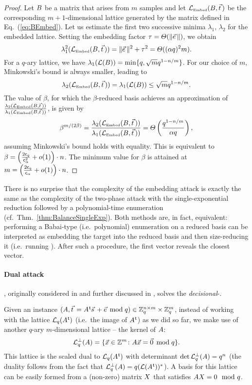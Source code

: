 \begin{proof}
	Let $B$ be a matrix that arises from $m$ \LWE samples and let $\LEmb(B, \tvec)$ be the corresponding $m+1$-dimensional lattice generated by the matrix defined in Eq.~(\ref{eq:BEmbed}). Let us estimate the first two successive minima $\lambda_1$, $\lambda_2$ for the embedded lattice. Setting the embedding factor $\tau = \TLandau(\| \evec \|)$, we obtain
	\[
		\lambda_1^2(\LEmb(\BMat, \tvec)) = \| \evec \|^2 + \tau^2 = \TLandau((\alpha q)^2 m).
	\]
	For a $q$-ary \LWE lattice, we have $\lambda_1(\mathcal{L}(B)) =\min \{ q, \sqrt{m} q^{1 - n/m} \}$. For our choice of $m$, Minkowski's bound is always smaller, leading to
	\[
		\lambda_2(\LEmb(\BMat, \tvec)) = \lambda_1(\Lat(\BMat)) \leq \sqrt{m} q^{1 - n/m}.
	\] 
	The value of $\beta$, for which the $\beta$-reduced basis achieves an approximation of $\frac{\lambda_2(\LEmb(\BMat, \tvec))} { \lambda_1(\LEmb(\BMat, \tvec))}$, is given by
	\[
		\beta^{m / (2 \beta)} = \frac{\lambda_2(\LEmb(\BMat, \tvec))}{\lambda_1(\LEmb(\BMat, \tvec))} = \TLandau \left( \frac{q^{1-n/m}}{\alpha q} \right),
	\]
	assuming Minkowski's bound holds with equality. This is equivalent to $\beta = \left( \frac{2 \mathsf{c}_q}{\mathsf{c}_{\alpha}^2} + o(1) \right) \cdot n$. The minimum value for $\beta$ is attained at $m = \left( \frac{2 \mathsf{c}_q}{\mathsf{c}_{\alpha}} + o(1) \right) \cdot n$. 
\end{proof}

There is no surprise that the complexity of the embedding attack is exactly the same as the complexity of the two-phase \BDD attack with the single-exponential reduction followed by a polynomial-time enumeration (cf.\ Thm.~\ref{thm:BalanceSingleExp}). Both methods are, in fact, equivalent: performing a Babai-type (i.e.\ polynomial) enumeration on a reduced basis can be interpreted as embedding the target into the reduced basis and then size-reducing it (i.e.\ running \LLL). After such a procedure, the first vector reveals the closest vector.

\paragraph{Dual attack \hspace*{-8pt}}, originally considered in \cite{MicReg09} and further discussed in \cite{C:KirFou15}, solves the \emph{decisional}-\LWE. 

Given an \LWE instance $(\AMat, \tvec = \AMat\transpose \svec + \evec \bmod q) \in \Z_q^{n \times m} \times \Z_q^m$, instead of working with the lattice $\mathcal{L}_q(A\mkern0.7mu^{\mathsf{ t}})$ (i.e.\ the image of $A\mkern0.7mu^{\mathsf{ t}}$) as we did so far, we make use of another $q$-ary $m$-dimensional lattice -- the kernel of $A$:
\begin{align} \label{eq:DualLattice}
	\qLATTp (\AMat) = \{ \xvec \in \Z^m \colon \AMat \xvec = \zerovec \bmod q \}.
\end{align}
This lattice is the scaled dual to $\mathcal{L}_q(A\mkern0.7mu^{\mathsf{ t}})$ with determinant $\det \mathcal{L}_q^{\perp} (A) = q^n$ (the duality follows from the fact that $\mathcal{L}_q^{\perp} (A) = q (\mathcal{L}(A\mkern0.7mu^{\mathsf{ t}}))^*$). A basis for this lattice can be easily formed from a (non-zero) matrix $X$ that satisfies $A X = 0 \mod q$.

